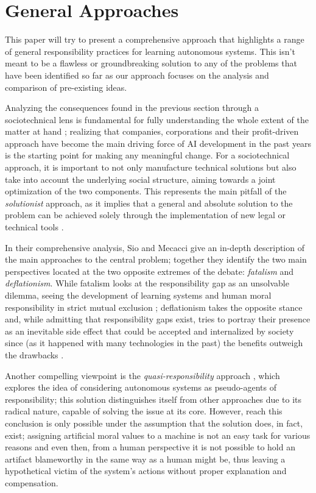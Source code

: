 \section{General Approaches}\label{sec:approaches}

This paper will try to present a comprehensive approach that highlights a range of general responsibility practices for learning autonomous systems.
This isn't meant to be a flawless or groundbreaking solution to any of the problems that have been identified so far as our approach focuses on the analysis and comparison of pre-existing ideas.

Analyzing the consequences found in the previous section through a sociotechnical lens is fundamental for fully un\-der\-stand\-ing the whole extent of the matter at hand \parencite{THETE, NOVAIA}; realizing that companies, corporations and their profit-driven approach have become the main driving force of AI development in the past years is the starting point for making any meaningful change.
For a sociotechnical approach, it is important to not only manufacture technical solutions but also take into account the underlying social structure, aiming towards a joint optimization of the two components.
This represents the main pitfall of the \textit{solutionist} approach, as it implies that a general and absolute solution to the problem can be achieved solely through the implementation of new legal or technical tools \parencite{MORTSE, STILML, SANFRG}.

In their comprehensive analysis, Sio and Mecacci give an in-depth description of the main approaches to the central problem; together they identify the two main perspectives located at the two opposite extremes of the debate: \textit{fatalism} and \textit{deflationism}.
While fatalism looks at the responsibility gap as an unsolvable dilemma, seeing the development of learning systems and human moral responsibility in strict mutual exclusion \parencite{MATTRG}; deflationism takes the opposite stance and, while admitting that responsibility gaps exist, tries to portray their presence as an inevitable side effect that could be accepted and internalized by society since (as it happened with many technologies in the past) the benefits outweigh the drawbacks \parencite{HAYTMP, SIJWA}.

Another compelling viewpoint is the \textit{quasi-responsibility} approach \parencite{STARCA}, which explores the idea of considering autonomous systems as pseudo-agents of responsibility; this solution distinguishes itself from other approaches due to its radical nature, capable of solving the issue at its core.
However, reach this conclusion is only possible under the assumption that the solution does, in fact, exist; assigning artificial moral values to a machine is not an easy task for various reasons and even then, from a human perspective it is not possible to hold an artifact blameworthy in the same way as a human might be, thus leaving a hypothetical victim of the system's actions without proper explanation and compensation.